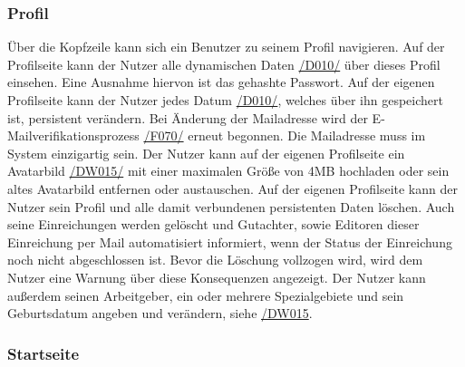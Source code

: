 \subsubsection{Profil} \label{nut:profil}
\begin{description}
     Über die Kopfzeile kann sich ein Benutzer zu seinem Profil navigieren.
     Auf der Profilseite kann der Nutzer alle dynamischen Daten \hyperref[d010]{/D010/} über dieses Profil einsehen.
    Eine Ausnahme hiervon ist das gehashte Passwort.
     Auf der eigenen Profilseite kann der Nutzer jedes Datum \hyperref[d010]{/D010/},
    welches über ihn gespeichert ist, persistent verändern.
     Bei Änderung der Mailadresse wird der E-Mailverifikationsprozess \hyperref[funkt:070]{/F070/} erneut
    begonnen. Die Mailadresse muss im System einzigartig sein.
     Der Nutzer kann auf der eigenen Profilseite ein Avatarbild \hyperref[d015]{/DW015/} mit einer maximalen
    Größe von 4MB hochladen oder sein altes Avatarbild entfernen oder austauschen.
     Auf der eigenen Profilseite kann der Nutzer sein Profil und alle damit verbundenen persistenten
    Daten löschen. Auch seine Einreichungen werden gelöscht und Gutachter, sowie Editoren dieser
    Einreichung per Mail automatisiert informiert, wenn der Status der Einreichung noch nicht abgeschlossen ist.
    Bevor die Löschung vollzogen wird, wird dem Nutzer eine Warnung über diese Konsequenzen angezeigt.
     Der Nutzer kann außerdem seinen Arbeitgeber, ein oder mehrere Spezialgebiete
    und sein Geburtsdatum angeben und verändern, siehe \hyperref[d015]{/DW015}.
\end{description}

\subsubsection{Startseite} \label{nut:start}

